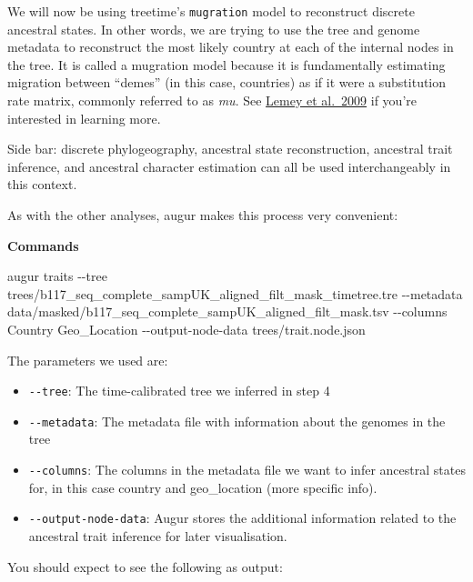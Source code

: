 \documentclass[
]{book}
\newenvironment{Shaded}{\begin{snugshade}}{\end{snugshade}}
\newcommand{\AttributeTok}[1]{\textcolor[rgb]{0.13,0.29,0.53}{#1}}
\newcommand{\ExtensionTok}[1]{#1}
\newcommand{\NormalTok}[1]{#1}
\providecommand{\tightlist}{%
  \setlength{\itemsep}{0pt}\setlength{\parskip}{0pt}}
\begin{document}
We will now be using treetime's \texttt{mugration} model to reconstruct discrete ancestral states. In other words, we are trying to use the tree and genome metadata to reconstruct the most likely country at each of the internal nodes in the tree. It is called a mugration model because it is fundamentally estimating migration between ``demes'' (in this case, countries) as if it were a substitution rate matrix, commonly referred to as \emph{mu}. See \href{https://pubmed.ncbi.nlm.nih.gov/19779555/}{Lemey et al.~2009} if you're interested in learning more.

Side bar: discrete phylogeography, ancestral state reconstruction, ancestral trait inference, and ancestral character estimation can all be used interchangeably in this context.

As with the other analyses, augur makes this process very convenient:

\textbf{Commands}

\begin{Shaded}
\begin{Highlighting}[]
\ExtensionTok{augur}\NormalTok{ traits }\AttributeTok{{-}{-}tree}\NormalTok{ trees/b117\_seq\_complete\_sampUK\_aligned\_filt\_mask\_timetree.tre }\AttributeTok{{-}{-}metadata}\NormalTok{ data/masked/b117\_seq\_complete\_sampUK\_aligned\_filt\_mask.tsv }\AttributeTok{{-}{-}columns}\NormalTok{ Country Geo\_Location }\AttributeTok{{-}{-}output{-}node{-}data}\NormalTok{ trees/trait.node.json}
\end{Highlighting}
\end{Shaded}

The parameters we used are:

\begin{itemize}
\tightlist
\item
  \texttt{-\/-tree}: The time-calibrated tree we inferred in step 4
\item
  \texttt{-\/-metadata}: The metadata file with information about the genomes in the tree
\item
  \texttt{-\/-columns}: The columns in the metadata file we want to infer ancestral states for, in this case country and geo\_location (more specific info).
\item
  \texttt{-\/-output-node-data}: Augur stores the additional information related to the ancestral trait inference for later visualisation.
\end{itemize}

You should expect to see the following as output:
\end{document}
